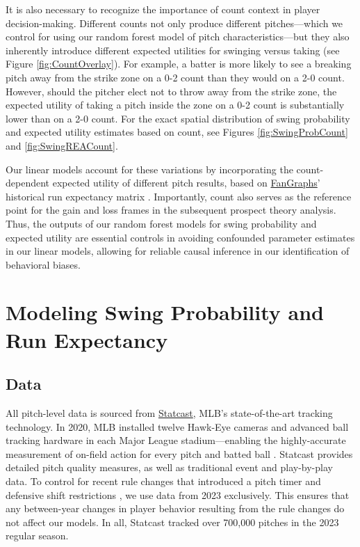 \documentclass[12pt]{article}
\numberwithin{equation}{section}
\begin{document}
It is also necessary to recognize the importance of count context in player decision-making. Different counts not only produce different pitches---which we control for using our random forest model of pitch characteristics---but they also inherently introduce different expected utilities for swinging versus taking (see Figure \ref{fig:CountOverlay}). For example, a batter is more likely to see a breaking pitch away from the strike zone on a 0-2 count than they would on a 2-0 count. However, should the pitcher elect not to throw away from the strike zone, the expected utility of taking a pitch inside the zone on a 0-2 count is substantially lower than on a 2-0 count. For the exact spatial distribution of swing probability and expected utility estimates based on count, see Figures \ref{fig:SwingProbCount} and \ref{fig:SwingREACount}.

\vspace{5mm} %

Our linear models account for these variations by incorporating the count-dependent expected utility of different pitch results, based on \href{https://www.fangraphs.com/}{FanGraphs}' historical run expectancy matrix \parencite{weinberg_re24_2014}. Importantly, count also serves as the reference point for the gain and loss frames in the subsequent prospect theory analysis. Thus, the outputs of our random forest models for swing probability and expected utility are essential controls in avoiding confounded parameter estimates in our linear models, allowing for reliable causal inference in our identification of behavioral biases.


\section{Modeling Swing Probability and Run Expectancy}

\subsection{Data}

All pitch-level data is sourced from \href{https://www.mlb.com/statcast}{Statcast}, MLB’s state-of-the-art tracking technology. In 2020, MLB installed twelve Hawk-Eye cameras and advanced ball tracking hardware in each Major League stadium---enabling the highly-accurate measurement of on-field action for every pitch and batted ball \parencite{noauthor_statcast}. Statcast provides detailed pitch quality measures, as well as traditional event and play-by-play data. To control for recent rule changes that introduced a pitch timer and defensive shift restrictions \parencite{Castrovince23}, we use data from 2023 exclusively. This ensures that any between-year changes in player behavior resulting from the rule changes do not affect our models. In all, Statcast tracked over 700,000 pitches in the 2023 regular season.
\end{document}
